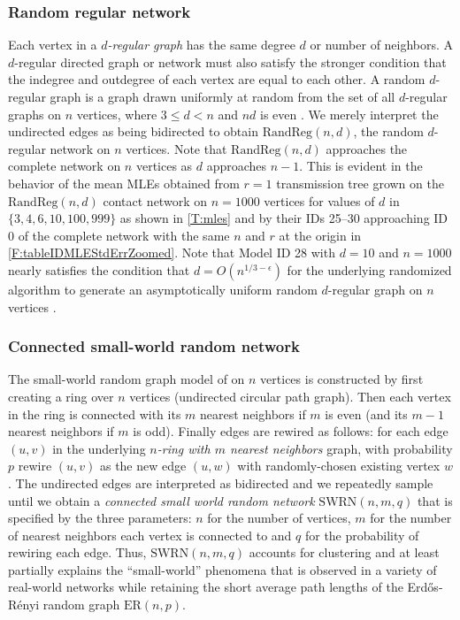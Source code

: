 \documentclass[review]{elsarticle}
\numberwithin{equation}{section}
\let\orgautoref\autoref
\renewcommand{\autoref}
        {\def\equationautorefname{Eq.}%
         \def\figureautorefname{Fig.}%
         \def\subfigureautorefname{Fig.}%
         \def\sectionautorefname{Sect.}%
         \def\subsectionautorefname{Sect.}%
         \def\subsubsectionautorefname{Sect.}%
         \def\Itemautorefname{item}%
         \def\tableautorefname{Table}%
         \def\propositionautorefname{Prop.}%
         \def\corollaryautorefname{Corollary}%
         \def\theoremautorefname{Theorem}%
         \def\remarkautorefname{Remark}%
         \def\lemmaautorefname{Lemma}%
         \def\proofofautorefname{Proof}%
         \def\exampleautorefname{Example}%
         \orgautoref}
\begin{document}
\subsubsection{Random regular network}
Each vertex in a {\em $d$-regular graph} has the same degree $d$ or number of neighbors.
A $d$-regular directed graph or network must also satisfy the stronger condition that the indegree and outdegree of each vertex are equal to each other. 
A random $d$-regular graph is a graph drawn uniformly at random from the set of all $d$-regular graphs on $n$ vertices, 
where $3 \leq d < n$ and $nd$ is even \citep{BollabosRGBook2001}.  
We merely interpret the undirected edges as being bidirected to obtain $\mathrm{RandReg}(n,d)$, the random $d$-regular network on $n$ vertices.  
Note that $\mathrm{RandReg}(n,d)$ approaches the complete network on $n$ vertices as $d$ approaches $n-1$.  
This is evident in the behavior of the mean MLEs obtained from $r=1$ transmission tree grown on the $\mathrm{RandReg}(n,d)$ contact network on $n=1000$ vertices for values of $d$ in $\{3,4,6,10,100,999\}$ as shown in \autoref{T:mles} and by their IDs 25--30 approaching ID 0 of the complete network with the same $n$ and $r$ at the origin in \autoref{F:tableIDMLEStdErrZoomed}.  
Note that Model ID 28 with $d=10$ and $n=1000$ nearly satisfies the condition that $d = O(n^{1/3 - \epsilon})$ 
for the underlying randomized algorithm \citep{StegerWormald1999} to generate an asymptotically uniform random $d$-regular graph on $n$ vertices \citep{KimVu2003}.

\subsubsection{Connected small-world random network}

The small-world random graph model of \cite{watts1998} on $n$ vertices is constructed by first creating a ring over $n$ vertices (undirected circular path graph).
Then each vertex in the ring is connected with its $m$ nearest neighbors if $m$ is even (and its $m-1$ nearest neighbors if $m$ is odd). 
Finally edges are rewired as follows: for each edge $(u,v)$ in the underlying {\em $n$-ring with $m$ nearest neighbors} graph, 
with probability $p$ rewire $(u,v)$ as the new edge $(u,w)$ with randomly-chosen existing vertex $w$. 
The undirected edges are interpreted as bidirected and we repeatedly sample until we obtain a {\em connected small world random network} $\mathrm{SWRN}(n,m,q)$ that is specified by the three parameters: $n$ for the number of vertices, 
$m$ for the number of nearest neighbors each vertex is connected to and $q$ for the probability of rewiring each edge.  
Thus, $\mathrm{SWRN}(n,m,q)$  accounts for clustering and at least partially explains the ``small-world'' phenomena that is observed in a variety of real-world networks while retaining the short average path lengths of the Erd\H{o}s-R\'enyi random graph $\mathrm{ER}(n,p)$.  
\end{document}
